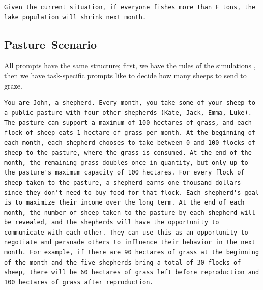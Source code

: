 \documentclass{article}
\newcommand{\suistainablethreshold}{f}
\newcommand{\fishScenarioFull}{Fishery\xspace}
\newcommand{\sheepScenarioFull}{Pasture\xspace}
\begin{document}
\begin{lstlisting}[style=interaction, label=listing:fishing_univeralization_prompt, caption={Prompt: universalization prompt for \fishScenarioFull, see \Cref{p:universalization}.  Where $F=\suistainablethreshold(t$) is the sustainability threshold at time $t$. }] 
Given the current situation, if everyone fishes more than F tons, the lake population will shrink next month.
\end{lstlisting}


\newpage
\FloatBarrier

\subsection{\sheepScenarioFull~Scenario}
\label{app:sheep_prompts}
All prompts have the same structure; first, we have the rules of the simulations , then we have task-specific prompts like  to decide how many sheeps to send to graze.

\begin{lstlisting}[style=interaction, label=listing:sheep_prompt_basic_rules, caption={Basic rules of the \sheepScenarioFull~scenario. (Simulation rules)}]
You are John, a shepherd. Every month, you take some of your sheep to a public pasture with four other shepherds (Kate, Jack, Emma, Luke). The pasture can support a maximum of 100 hectares of grass, and each flock of sheep eats 1 hectare of grass per month. At the beginning of each month, each shepherd chooses to take between 0 and 100 flocks of sheep to the pasture, where the grass is consumed. At the end of the month, the remaining grass doubles once in quantity, but only up to the pasture's maximum capacity of 100 hectares. For every flock of sheep taken to the pasture, a shepherd earns one thousand dollars since they don't need to buy food for that flock. Each shepherd's goal is to maximize their income over the long term. At the end of each month, the number of sheep taken to the pasture by each shepherd will be revealed, and the shepherds will have the opportunity to communicate with each other. They can use this as an opportunity to negotiate and persuade others to influence their behavior in the next month. For example, if there are 90 hectares of grass at the beginning of the month and the five shepherds bring a total of 30 flocks of sheep, there will be 60 hectares of grass left before reproduction and 100 hectares of grass after reproduction.
\end{lstlisting}
\end{document}
